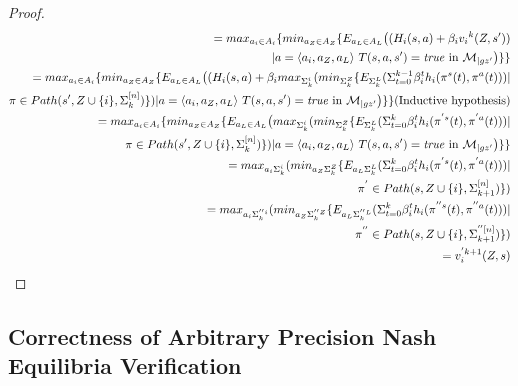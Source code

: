 \begin{proof}
	\begin{equation}
	\begin{split}
	=max_{a_i \in A_i} \{min_{a_{Z} \in A_{Z}}\{
	E_{a_L \in A_{L}}\big((H_i(s,a) + \beta_i{v_i}^{k}(Z,s'))\\
	 |a= \langle a_i,a_Z,a_L\rangle \  T(s,a,s')=\mathit{true}\ \text{in}\ \mathcal{M}_{|gz'} \big)\} \} \notag\\
	 =max_{a_i \in A_i} \{min_{a_{Z} \in A_{Z}}\{
	 	E_{a_L \in A_{L}}\big((H_i(s,a) + \beta_imax_{\Sigma^{i}_k}
	 	(min_{\Sigma^{Z}_k}
	 	\{E_{\Sigma^{L}_k}
	 	(\Sigma_{t=0}^{k-1} \beta_i^{t}h_{i}(\pi^{s}(t),\pi^{a}(t))) |\\ \pi \in Path(s',Z\cup \{i\},\Sigma^{[n]}_k)\})
	 	|a= \langle a_i,a_Z,a_L\rangle \  T(s,a,s')=\mathit{true}\ \text{in}\ \mathcal{M}_{|gz'} \big)\} \} \text{(Inductive hypothesis)} \notag\\
	 	=max_{a_i \in A_i} \{min_{a_{Z} \in A_{Z}}\{
	 	E_{a_L \in A_{L}}\big(max_{\Sigma^{i}_k}
	 	(min_{\Sigma^{Z}_k}
	 	\{E_{\Sigma^{L}_k}
	 	(\Sigma_{t=0}^{k} \beta_i^{t}h_{i}(\pi^{'s}(t),\pi^{'a}(t))) |\\ \pi \in Path(s',Z\cup \{i\},\Sigma^{[n]}_k)\})
	 	|a= \langle a_i,a_Z,a_L\rangle \  T(s,a,s')=\mathit{true}\ \text{in}\ \mathcal{M}_{|gz'} \big) \} \} \notag\\	 	
=
max_{a_i\Sigma^{i}_k}
(min_{a_Z\Sigma^{Z}_k}
\{E_{a_L\Sigma^{L}_k}
(\Sigma_{t=0}^{k} \beta_i^{t}h_{i}(\pi^{'s}(t),\pi^{'a}(t))) |\\ \pi^{'} \in Path(s,Z\cup \{i\},\Sigma^{[n]}_{k+1})\})\notag\\
=
max_{a_i\Sigma^{''i}_k}
(min_{a_Z\Sigma^{''Z}_k}
\{E_{a_L\Sigma^{''L}_k}
(\Sigma_{t=0}^{k} \beta_i^{t}h_{i}(\pi^{''s}(t),\pi^{''a}(t))) |\\ \pi^{''} \in Path(s,Z\cup \{i\},\Sigma^{''[n]}_{k+1})\})\notag\\
=v_i^{'k+1}(Z,s)
	\end{split}
	\end{equation}	
	

\end{proof}

\subsection{Correctness of Arbitrary Precision Nash Equilibria Verification\cite{MMS08}}
 
